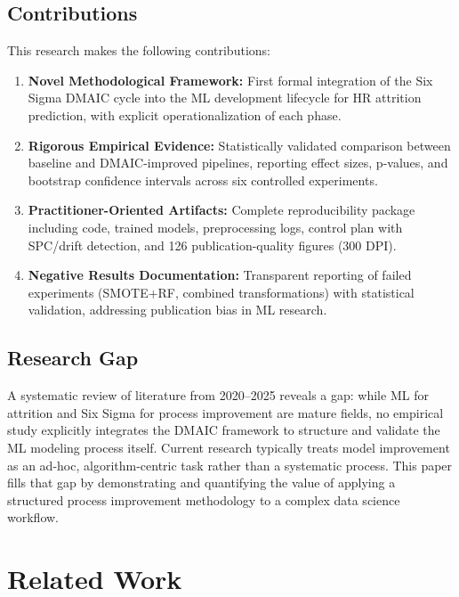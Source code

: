 \documentclass[conference]{IEEEtran}
\begin{document}
\subsection{Contributions}

This research makes the following contributions:

\begin{enumerate}
    \item \textbf{Novel Methodological Framework:} First formal integration of the Six Sigma DMAIC cycle into the ML development lifecycle for HR attrition prediction, with explicit operationalization of each phase.
    
    \item \textbf{Rigorous Empirical Evidence:} Statistically validated comparison between baseline and DMAIC-improved pipelines, reporting effect sizes, p-values, and bootstrap confidence intervals across six controlled experiments.
    
    \item \textbf{Practitioner-Oriented Artifacts:} Complete reproducibility package including code, trained models, preprocessing logs, control plan with SPC/drift detection, and 126 publication-quality figures (300 DPI).
    
    \item \textbf{Negative Results Documentation:} Transparent reporting of failed experiments (SMOTE+RF, combined transformations) with statistical validation, addressing publication bias in ML research.
\end{enumerate}

\subsection{Research Gap}

A systematic review of literature from 2020--2025 reveals a gap: while ML for attrition \cite{zhao2021employee} and Six Sigma for process improvement \cite{montgomery2019introduction} are mature fields, no empirical study explicitly integrates the DMAIC framework to structure and validate the ML modeling process itself. Current research typically treats model improvement as an ad-hoc, algorithm-centric task rather than a systematic process. This paper fills that gap by demonstrating and quantifying the value of applying a structured process improvement methodology to a complex data science workflow.

\section{Related Work}
\end{document}
